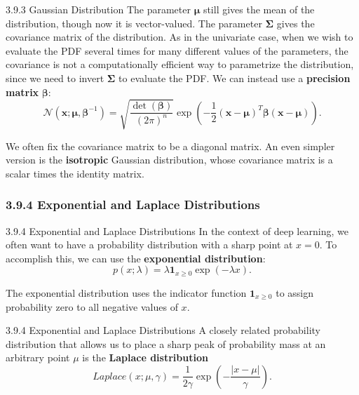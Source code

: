 \begin{frame}{3.9.3 Gaussian Distribution}
    \justifying
    The parameter $\boldsymbol{\mu}$ still gives the mean of the distribution, though now it is vector-valued. The parameter $\boldsymbol{\Sigma}$ gives the covariance matrix of the distribution. As in the univariate case, when we wish to evaluate the PDF several times for many different values of the parameters, the covariance is not a computationally efficient way to parametrize the distribution, since we need to invert $\boldsymbol{\Sigma}$ to evaluate the PDF. We can instead use a \textbf{precision matrix} $\boldsymbol{\beta}$:
    \begin{equation}
        \mathcal{N}(\boldsymbol{x}; \boldsymbol{\mu}, \boldsymbol{\beta}^{-1}) = \sqrt{\frac{\det(\boldsymbol{\beta})}{(2 \pi)^{n}}} \exp\left(-\frac{1}{2}(\boldsymbol{x} - \boldsymbol{\mu})^{T} \boldsymbol{\beta} (\boldsymbol{x} - \boldsymbol{\mu})\right).        
        \label{eq:3_24}
    \end{equation}
    
    We often fix the covariance matrix to be a diagonal matrix. An even simpler version is the \textbf{isotropic} Gaussian distribution, whose covariance matrix is a scalar times the identity matrix.
\end{frame}

\subsubsection{3.9.4 Exponential and Laplace Distributions}
\begin{frame}{3.9.4 Exponential and Laplace Distributions}
    \justifying
    In the context of deep learning, we often want to have a probability distribution with a sharp point at $x = 0$. To accomplish this, we can use the \textbf{exponential distribution}:
    \begin{equation}
        p(x; \lambda) = \lambda\boldsymbol{1}_{x\geq0}\exp(-\lambda x).
        \label{eq:3_25}
    \end{equation}
    
    The exponential distribution uses the indicator function $\boldsymbol{1}_{x\geq0}$ to assign probability zero to all negative values of $x$.
\end{frame}

\begin{frame}{3.9.4 Exponential and Laplace Distributions}
    \justifying
    A closely related probability distribution that allows us to place a sharp peak of probability mass at an arbitrary point $\mu$ is the \textbf{Laplace distribution}
    \begin{equation}
        Laplace(x; \mu, \gamma) = \frac{1}{2\gamma}\exp\left(-\frac{|x - \mu|}{\gamma} \right).
        \label{eq:3_26}
    \end{equation}
\end{frame}

